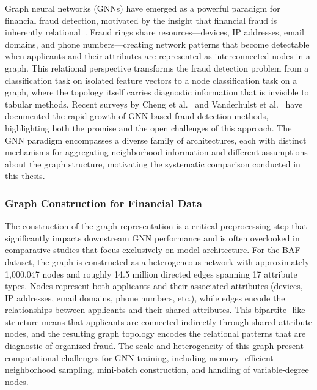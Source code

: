 Graph neural networks (GNNs) have emerged as a powerful paradigm for financial
fraud detection, motivated by the insight that financial fraud is inherently
relational~\cite{pourhabibi2022graph}. Fraud rings share resources---devices, IP
addresses, email domains, and phone numbers---creating network patterns that
become detectable when applicants and their attributes are represented as
interconnected nodes in a graph. This relational perspective transforms the
fraud detection problem from a classification task on isolated feature vectors
to a node classification task on a graph, where the topology itself carries
diagnostic information that is invisible to tabular methods. Recent surveys by
Cheng et al.~\cite{cheng2024graph} and Vanderhulst et
al.~\cite{vanderhulst2024graph} have documented the rapid growth of GNN-based
fraud detection methods, highlighting both the promise and the open challenges
of this approach. The GNN paradigm encompasses a diverse family of
architectures, each with distinct mechanisms for aggregating neighborhood
information and different assumptions about the graph structure, motivating the
systematic comparison conducted in this thesis.

\subsubsection{Graph Construction for Financial Data}

The construction of the graph representation is a critical preprocessing step
that significantly impacts downstream GNN performance and is often overlooked in
comparative studies that focus exclusively on model architecture. For the BAF
dataset, the graph is constructed as a heterogeneous network with approximately
1,000,047 nodes and roughly 14.5 million directed edges spanning 17 attribute
types. Nodes represent both applicants and their associated attributes (devices,
IP addresses, email domains, phone numbers, etc.), while edges encode the
relationships between applicants and their shared attributes. This bipartite-
like structure means that applicants are connected indirectly through shared
attribute nodes, and the resulting graph topology encodes the relational
patterns that are diagnostic of organized fraud. The scale and heterogeneity of
this graph present computational challenges for GNN training, including memory-
efficient neighborhood sampling, mini-batch construction, and handling of
variable-degree nodes.

